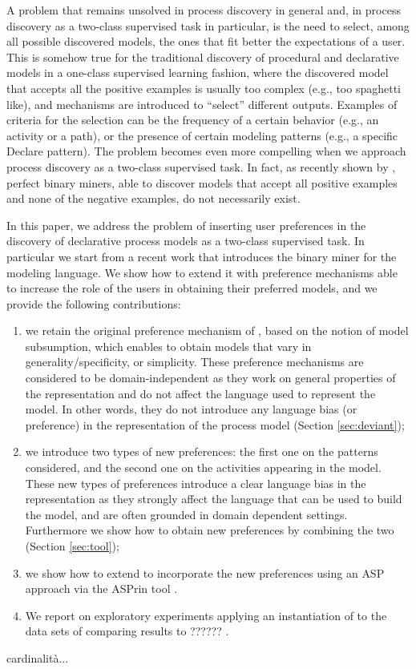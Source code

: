 A problem that remains unsolved in process discovery in general and, in process discovery as a two-class supervised task in particular, is the need to select, among all possible discovered models, the ones that fit better the expectations of a user. This is somehow true for the traditional discovery of procedural and declarative models in a one-class supervised learning fashion, where the discovered model that accepts all the positive examples is usually too complex (e.g., too spaghetti like), and mechanisms are introduced to ``select'' different outputs. Examples of criteria for the selection can be the frequency of a certain behavior (e.g., an activity or a path), or the presence of certain modeling patterns (e.g., a specific Declare pattern).   
The problem becomes even more compelling when we approach process discovery as a two-class supervised task. In fact, as recently shown by \cite{DBLP:conf/bpm/SlaatsDB21}, perfect binary miners, able to discover models that accept all positive examples and none of the negative examples, do not necessarily exist.  
 
In this paper, we address the problem of inserting user preferences in the discovery of declarative process models  as a two-class supervised task. In particular we start from a recent work \cite{deviant-arxiv} that introduces the \nd binary miner for the \declare \cite{2009-Aalst} modeling language. We show how to extend it with preference mechanisms able to increase the role of the users in obtaining their preferred models, and we provide the following contributions: 
\begin{enumerate}[{(i)}]
	\item we retain the original preference mechanism of \nd, based on the notion of model subsumption, which enables to obtain models that vary in generality/specificity, or simplicity. These preference mechanisms are considered to be domain-independent as they work on general properties of the representation and do not affect the language used to represent the model. In other words, they do not introduce any language bias (or preference) in the representation of the process model (Section \ref{sec:deviant});
	\item we introduce two types of new preferences: the first one on the \declare patterns considered, and the second one on the activities appearing in the model. These new types of preferences introduce a clear language bias in the representation as they strongly affect the language that can be used to build the model, and are often grounded in domain dependent settings. Furthermore we show how to obtain new preferences by combining the two (Section \ref{sec:tool}); 
	\item we show how to extend \nd to incorporate the new preferences using an \ac{ASP} \cite{2008-Lifschitz} approach via the ASPrin tool \cite{DBLP:conf/aaai/BrewkaD0S15}.   
	\item We report on exploratory experiments applying an instantiation of \nd  to the data sets of \cite{DBLP:conf/bpm/SlaatsDB21} comparing results to ?????? .
\end{enumerate}


cardinalità...